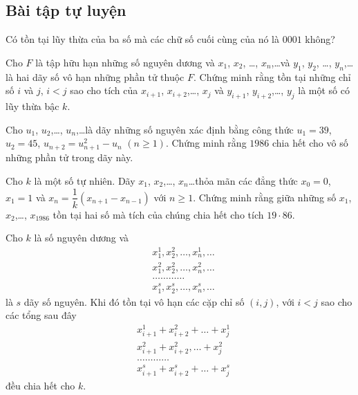 \subsection{Bài tập tự luyện}
\begin{bt}
	Có tồn tại lũy thừa của ba số mà các chữ số cuối cùng của nó là $0001$ không?
\end{bt}
\begin{bt}
	Cho $F$ là tập hữu hạn những số nguyên dương và $x_1$, $x_2$, \ldots, $x_n$,\ldots và  $y_1$, $y_2$, \ldots, $y_n$,\ldots là hai dãy số vô hạn những phần tử thuộc $F$. Chứng minh rằng tồn tại những chỉ số $i$ và $j$, $i<j$ sao cho tích của $x_{i+1}$, $x_{i+2}$,\ldots, $x_j$ và $y_{i+1}$, $y_{i+2}$,\ldots, $y_j$ là một số có lũy thừa bậc $k$.
\end{bt}
\begin{bt}
	Cho $u_1$, $u_2$,\ldots, $u_n$,\ldots là dãy những số nguyên xác định bằng công thức $u_1=39$, $u_2=45$, $u_{n+2}=u_{n+1}^2-u_{n}$ $(n\geq 1)$. Chứng minh rằng $1986$ chia hết cho vô số những phần tử trong dãy này.
\end{bt}
\begin{bt}
	Cho $k$ là một số tự nhiên. Dãy $x_1$, $x_2$,\ldots, $x_n$\ldots thỏa mãn các đẳng thức $x_0=0$, $x_1=1$ và $x_n=\dfrac{1}{k}(x_{n+1}-x_{n-1})$ với $n\geq 1$. Chứng minh rằng giữa những số $x_1$, $x_2$,\ldots, $x_{1986}$ tồn tại hai số mà tích của chúng chia hết cho tích $19\cdot 86$.
\end{bt}
\begin{bt}
	Cho $k$ là số nguyên dương và
	\begin{eqnarray*}
		&x_1^1, x_2^2,\ldots, x_n^1,\ldots\\
		&x_1^2, x_2^2,\ldots, x_n^2,\ldots\\
		&\ldots\ldots\ldots\ldots\\
		&x_1^s, x_2^s,\ldots, x_n^s,\ldots
	\end{eqnarray*}	
	là $s$ dãy số nguyên. Khi đó tồn tại vô hạn các cặp chỉ số $(i,j)$, với $i<j$ sao cho các tổng sau đây
	\begin{eqnarray*}
		&x_{i+1}^1+ x_{i+2}^2+\ldots+ x_j^1\\
		&x_{i+1}^2+ x_{i+2}^2,\ldots+ x_j^2\\
		&\ldots\ldots\ldots\ldots\\
		&x_{i+1}^s+ x_{i+2}^s+\ldots+ x_j^s
	\end{eqnarray*}
	đều chia hết cho $k$.
\end{bt}

